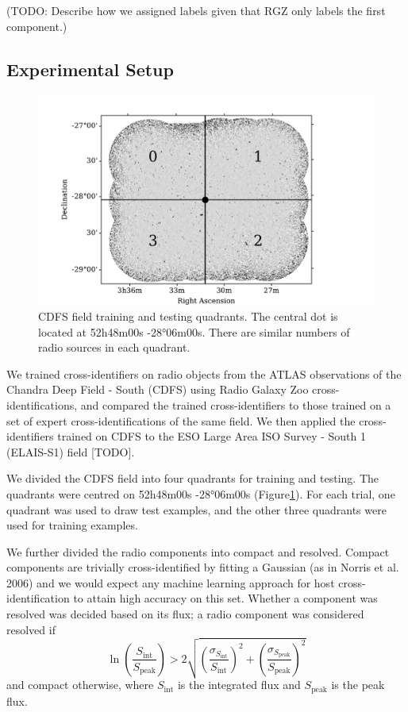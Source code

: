 \documentclass[fleqn,usenatbib,usedcolumn]{mnras}
\newcommand{\text}{\mathrm}
\begin{document}
    (TODO: Describe how we assigned labels given that RGZ only labels the
    first component.)

  \subsection{Experimental Setup}\label{experimental-setup}

    \begin{figure}
    \centering
    \includegraphics{images/quadrants.pdf}
    \caption{CDFS field training and testing quadrants. The central dot is
    located at 52h48m00s -28°06m00s. There are similar numbers of radio
    sources in each quadrant.\label{fig:quadrants}}
    \end{figure}

    We trained cross-identifiers on radio objects from the ATLAS
    observations of the Chandra Deep Field - South (CDFS) using Radio Galaxy
    Zoo cross-identifications, and compared the trained cross-identifiers to
    those trained on a set of expert cross-identifications of the same
    field. We then applied the cross-identifiers trained on CDFS to the ESO
    Large Area ISO Survey - South 1 (ELAIS-S1) field {[}TODO{]}.

    We divided the CDFS field into four quadrants for training and testing.
    The quadrants were centred on 52h48m00s -28°06m00s
    ({Figure}\ref{fig:quadrants}). For each trial, one quadrant
    was used to draw test examples, and the other three quadrants were used
    for training examples.

    We further divided the radio components into compact and resolved.
    Compact components are trivially cross-identified by fitting a Gaussian
    (as in Norris et al. 2006) and we would expect any machine learning
    approach for host cross-identification to attain high accuracy on this
    set. Whether a component was resolved was decided based on its flux; a
    radio component was considered resolved if \[
        \ln \left(\frac{S_{\text{int}}}{S_{\text{peak}}}\right) > 2\sqrt{\left(\frac{\sigma_{S_{\text{int}}}}{S_{\text{int}}}\right)^2 + \left(\frac{\sigma_{S_{\text{peak}}}}{S_{\text{peak}}}\right)^2}
    \] and compact otherwise, where \(S_{\text{int}}\) is the integrated
    flux and \(S_{\text{peak}}\) is the peak flux.
\end{document}

